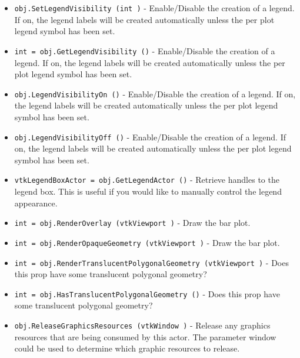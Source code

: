 \begin{itemize}
\item  \verb|obj.SetLegendVisibility (int )| -  Enable/Disable the creation of a legend. If on, the legend labels will
 be created automatically unless the per plot legend symbol has been
 set.

\item  \verb|int = obj.GetLegendVisibility ()| -  Enable/Disable the creation of a legend. If on, the legend labels will
 be created automatically unless the per plot legend symbol has been
 set.

\item  \verb|obj.LegendVisibilityOn ()| -  Enable/Disable the creation of a legend. If on, the legend labels will
 be created automatically unless the per plot legend symbol has been
 set.

\item  \verb|obj.LegendVisibilityOff ()| -  Enable/Disable the creation of a legend. If on, the legend labels will
 be created automatically unless the per plot legend symbol has been
 set.

\item  \verb|vtkLegendBoxActor = obj.GetLegendActor ()| -  Retrieve handles to the legend box. This is useful if you would like 
 to manually control the legend appearance.

\item  \verb|int = obj.RenderOverlay (vtkViewport )| -  Draw the bar plot.

\item  \verb|int = obj.RenderOpaqueGeometry (vtkViewport )| -  Draw the bar plot.

\item  \verb|int = obj.RenderTranslucentPolygonalGeometry (vtkViewport )| -  Does this prop have some translucent polygonal geometry?

\item  \verb|int = obj.HasTranslucentPolygonalGeometry ()| -  Does this prop have some translucent polygonal geometry?

\item  \verb|obj.ReleaseGraphicsResources (vtkWindow )| -  Release any graphics resources that are being consumed by this actor.
 The parameter window could be used to determine which graphic
 resources to release.

\end{itemize}
